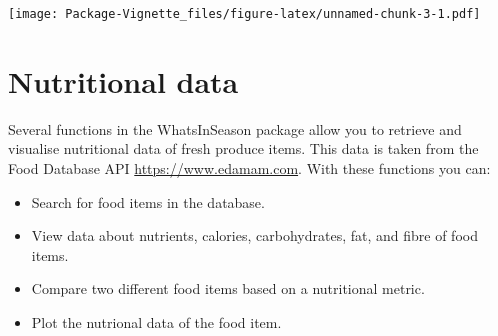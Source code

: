 \documentclass[
]{article}
\providecommand{\tightlist}{%
  \setlength{\itemsep}{0pt}\setlength{\parskip}{0pt}}
\begin{document}
\texttt{[image: Package-Vignette\_files/figure-latex/unnamed-chunk-3-1.pdf]}

\hypertarget{nutritional-data}{%
\section{Nutritional data}\label{nutritional-data}}

Several functions in the WhatsInSeason package allow you to retrieve and
visualise nutritional data of fresh produce items. This data is taken
from the Food Database API \url{https://www.edamam.com}. With these
functions you can:

\begin{itemize}
\tightlist
\item
  Search for food items in the database.\\
\item
  View data about nutrients, calories, carbohydrates, fat, and fibre of
  food items.\\
\item
  Compare two different food items based on a nutritional metric.\\
\item
  Plot the nutrional data of the food item.
\end{itemize}
\end{document}
